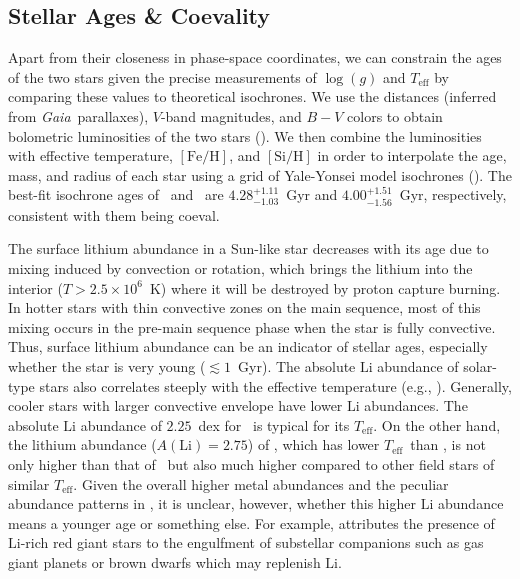 \documentclass[modern, letterpaper]{aastex61}
\newcommand{\project}[1]{\textsl{#1}}
\newcommand{\gaia}{\project{Gaia}}
\newcommand*\elem[1]{\ensuremath{\mathrm{#1}}}
\newcommand*\elemH[1]{\ensuremath{[\mathrm{#1}/\elem{H}]}}
\newcommand*\teff{\ensuremath{T_\mathrm{eff}}}
\newcommand{\sunanalog}{\text{Krios}}
\newcommand{\bizarreone}{\text{Kronos}}
\begin{document}
\subsection{Stellar Ages \& Coevality}
\label{sub:ages}

Apart from their closeness in phase-space coordinates,
we can constrain the ages of the two stars
given the precise measurements of $\log(g)$ and $T_\mathrm{eff}$
by comparing these values to theoretical isochrones.
We use the distances (inferred from \gaia\ parallaxes), $V$-band magnitudes,
and $B-V$ colors to obtain bolometric luminosities of the two stars
(\citealt{2003AJ....126..778V}).
We then combine the luminosities with effective temperature, \elemH{Fe}, and
\elemH{Si} in order to interpolate the age, mass, and radius of each star using
a grid of Yale-Yonsei model isochrones (\citealt{2013ApJ...776...87S}).
The best-fit isochrone ages of \bizarreone\ and \sunanalog\ are
$4.28_{-1.03}^{+1.11}$~Gyr and $4.00_{-1.56}^{+1.51}$~Gyr, respectively,
consistent with them being coeval.

The surface lithium abundance in a Sun-like star decreases with its age due to
mixing induced by convection or rotation, which brings the lithium into the
interior ($T>2.5 \times 10^{6}$~K) where it will be destroyed by proton capture
burning.
In hotter stars with thin convective zones on the main sequence, most of this
mixing occurs in the pre-main sequence phase when the star is fully convective.
Thus, surface lithium abundance can be an indicator of stellar ages,
especially whether the star is very young ($\lesssim 1$~Gyr).
The absolute $\elem{Li}$ abundance of solar-type stars also correlates steeply
with the effective temperature (e.g., \citealt{Chen2001,2012ApJ...756...46R}).
Generally, cooler stars with larger convective envelope have lower \elem{Li}
abundances.
The absolute $\elem{Li}$ abundance of $2.25$~dex for \sunanalog\
is typical for its \teff.
On the other hand, the lithium abundance ($A(\elem{Li}) = 2.75$) of \bizarreone,
which has lower \teff\ than \sunanalog, is not only higher than that of
\sunanalog\ but also much higher compared to other field stars of similar \teff.
Given the overall higher metal abundances and the peculiar abundance patterns
in \bizarreone, it is unclear, however, whether this higher $\elem{Li}$
abundance means a younger age or something else.
For example, \citealt{Casey:2016aa} attributes the presence of $\elem{Li}$-rich
red giant stars to the engulfment of substellar companions such as gas giant
planets or brown dwarfs which may replenish $\elem{Li}$.
\end{document}
